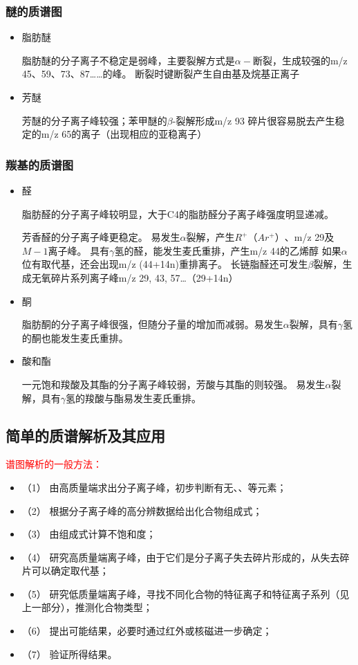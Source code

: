 \subsubsection*{醚的质谱图}
\begin{itemize}
    \item 脂肪醚
    
    脂肪醚的分子离子不稳定是弱峰，主要裂解方式是$\alpha -$断裂，生成较强的m/z 45、59、73、87……的峰。
    断裂时键断裂产生自由基及烷基正离子
    \item 芳醚
    
    芳醚的分子离子峰较强；苯甲醚的$\beta$-裂解形成m/z 93 碎片很容易脱去产生稳定的m/z 65的离子（出现相应的亚稳离子）
\end{itemize}
\subsubsection*{羰基的质谱图}
\begin{itemize}
    \item  醛
    
    脂肪醛的分子离子峰较明显，大于C4的脂肪醛分子离子峰强度明显递减。
    
    芳香醛的分子离子峰更稳定。
    易发生$\alpha$裂解，产生$R^{+}（Ar^{+}）$、m/z 29及$M-1$离子峰。
    具有$\gamma$氢的醛，能发生麦氏重排，产生m/z 44的乙烯醇
    如果$\alpha$位有取代基，还会出现m/z (44+14n)重排离子。
    长链脂醛还可发生$\beta$裂解，生成无氧碎片系列离子峰m/z 29, 43, 57…（29+14n）
    \item  酮
    
    脂肪酮的分子离子峰很强，但随分子量的增加而减弱。易发生$\alpha$裂解，具有$\gamma$氢的酮也能发生麦氏重排。
    \item 酸和酯
    
    一元饱和羧酸及其酯的分子离子峰较弱，芳酸与其酯的则较强。
    易发生$\alpha$裂解，具有$\gamma$氢的羧酸与酯易发生麦氏重排。
\end{itemize}

\subsection{简单的质谱解析及其应用}
\begin{note}
    

\textcolor{red}{谱图解析的一般方法：}
\begin{itemize}
    \item（1） 由高质量端求出分子离子峰，初步判断有无、、等元素；
    \item（2） 根据分子离子峰的高分辨数据给出化合物组成式；
    \item（3） 由组成式计算不饱和度；
    \item（4） 研究高质量端离子峰，由于它们是分子离子失去碎片形成的，从失去碎片可以确定取代基；
    \item（5） 研究低质量端离子峰，寻找不同化合物的特征离子和特征离子系列（见上一部分），推测化合物类型；
    \item（6） 提出可能结果，必要时通过红外或核磁进一步确定；
    \item（7） 验证所得结果。
\end{itemize}
\end{note}

